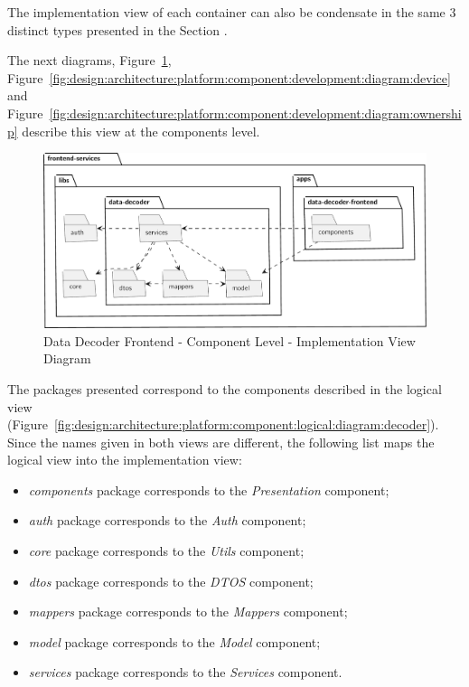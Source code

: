 The implementation view of each container can also be condensate in the same 3 distinct types presented in the Section .

The next diagrams, Figure~\ref{fig:design:architecture:platform:component:development:diagram:decoder}, Figure~\ref{fig:design:architecture:platform:component:development:diagram:device} and Figure~\ref{fig:design:architecture:platform:component:development:diagram:ownership} describe this view at the components level.

\begin{figure}[H]
   \centering
   \includegraphics[page=1,width=\columnwidth]{assets/diagrams/design/architectural/level3/development/data-decoder-frontend.pdf}
   \caption[Data Decoder Frontend - Component Level - Implementation View Diagram]{Data Decoder Frontend - Component Level - Implementation View Diagram}
   \label{fig:design:architecture:platform:component:development:diagram:decoder}
\end{figure}

The packages presented correspond to the components described in the logical view (Figure~\ref{fig:design:architecture:platform:component:logical:diagram:decoder}). Since the names given in both views are different, the following list maps the logical view into the implementation view:

\begin{itemize}
   \item \textit{components} package corresponds to the \textit{Presentation} component;
   \item \textit{auth} package corresponds to the \textit{Auth} component;
   \item \textit{core} package corresponds to the \textit{Utils} component;
   \item \textit{dtos} package corresponds to the \textit{DTOS} component;
   \item \textit{mappers} package corresponds to the \textit{Mappers} component;
   \item \textit{model} package corresponds to the \textit{Model} component;
   \item \textit{services} package corresponds to the \textit{Services} component.
\end{itemize}

